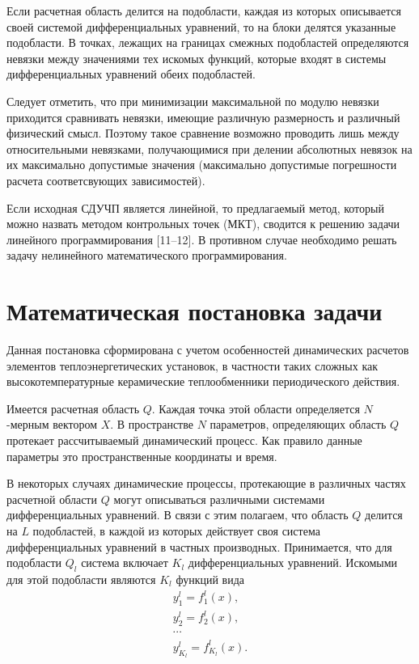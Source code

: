 \documentclass[a4paper,12pt]{article}
\begin{document}
Если расчетная область делится на подобласти, каждая из которых описывается
своей системой дифференциальных уравнений, то на блоки делятся указанные
подобласти. В точках, лежащих на границах смежных подобластей определяются
невязки между значениями тех искомых функций, которые входят в системы
дифференциальных уравнений обеих подобластей.

Следует отметить, что при минимизации максимальной по модулю невязки
приходится сравнивать невязки, имеющие различную размерность и различный
физический смысл.  Поэтому такое сравнение возможно проводить лишь между
относительными невязками, получающимися при делении абсолютных невязок на
их максимально допустимые значения (максимально допустимые погрешности
расчета соответсвующих зависимостей).

Если исходная СДУЧП является линейной, то предлагаемый метод, который можно
назвать методом контрольных точек (МКТ), сводится к решению задачи
линейного программирования [11–12]. В противном случае необходимо
решать задачу нелинейного математического программирования.

\section{Математическая постановка задачи}

Данная постановка сформирована с учетом особенностей динамических расчетов
элементов теплоэнергетических установок, в частности таких сложных как
высокотемпературные керамические теплообменники периодического действия.

Имеется расчетная область $Q$. Каждая точка этой области определяется
$N$-мерным вектором $X$. В пространстве $N$ параметров, определяющих
область $Q$ протекает рассчитываемый динамический процесс. Как правило
данные параметры это пространственные координаты и время.

В некоторых случаях динамические процессы, протекающие в различных частях
расчетной области $Q$ могут описываться различными системами
дифференциальных уравнений. В связи с этим полагаем, что область $Q$
делится на $L$ подобластей, в каждой из которых действует своя система
дифференциальных уравнений в частных производных. Принимается, что для
подобласти $Q_l$ система включает $K_l$ дифференциальных уравнений.
Искомыми для этой подобласти являются $K_l$ функций вида
\begin{equation} 
    \begin{array}{ll} 
        y^l_1=f^l_1(x), \\ 
        y^l_2=f^l_2(x), \\
        \cdots \\ 
        y^l_{K_l}=f^l_{K_l}(x).  
    \end{array} 
    \label{desir-fnc}
\end{equation}
\end{document}

